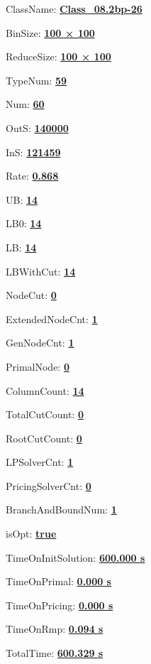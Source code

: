 \documentclass[11pt]{article}
\begin{document}
\pagestyle{empty}


ClassName: \underline{\textbf{Class_08.2bp-26}}
\par
BinSize: \underline{\textbf{100 × 100}}
\par
ReduceSize: \underline{\textbf{100 × 100}}
\par
TypeNum: \underline{\textbf{59}}
\par
Num: \underline{\textbf{60}}
\par
OutS: \underline{\textbf{140000}}
\par
InS: \underline{\textbf{121459}}
\par
Rate: \underline{\textbf{0.868}}
\par
UB: \underline{\textbf{14}}
\par
LB0: \underline{\textbf{14}}
\par
LB: \underline{\textbf{14}}
\par
LBWithCut: \underline{\textbf{14}}
\par
NodeCut: \underline{\textbf{0}}
\par
ExtendedNodeCnt: \underline{\textbf{1}}
\par
GenNodeCnt: \underline{\textbf{1}}
\par
PrimalNode: \underline{\textbf{0}}
\par
ColumnCount: \underline{\textbf{14}}
\par
TotalCutCount: \underline{\textbf{0}}
\par
RootCutCount: \underline{\textbf{0}}
\par
LPSolverCnt: \underline{\textbf{1}}
\par
PricingSolverCnt: \underline{\textbf{0}}
\par
BranchAndBoundNum: \underline{\textbf{1}}
\par
isOpt: \underline{\textbf{true}}
\par
TimeOnInitSolution: \underline{\textbf{600.000 s}}
\par
TimeOnPrimal: \underline{\textbf{0.000 s}}
\par
TimeOnPricing: \underline{\textbf{0.000 s}}
\par
TimeOnRmp: \underline{\textbf{0.094 s}}
\par
TotalTime: \underline{\textbf{600.329 s}}
\par
\newpage


\end{document}
